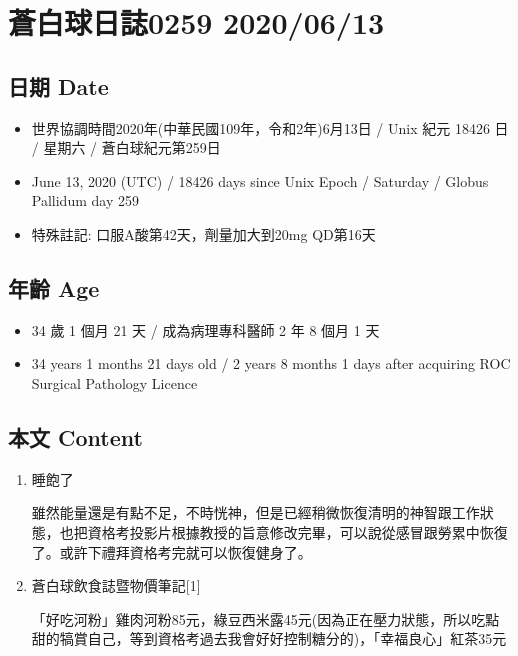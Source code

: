 \documentclass[a5paper, 11pt
]{book}
\providecommand{\tightlist}{%
  \setlength{\itemsep}{0pt}\setlength{\parskip}{0pt}}
\begin{document}
\hypertarget{ux84bcux767dux7403ux65e5ux8a8c0259-20200613}{%
\section{蒼白球日誌0259
2020/06/13}\label{ux84bcux767dux7403ux65e5ux8a8c0259-20200613}}

\hypertarget{ux65e5ux671f-date-12}{%
\subsection{日期 Date}\label{ux65e5ux671f-date-12}}

\begin{itemize}
\tightlist
\item
  世界協調時間2020年(中華民國109年，令和2年)6月13日 / Unix 紀元 18426 日
  / 星期六 / 蒼白球紀元第259日
\item
  June 13, 2020 (UTC) / 18426 days since Unix Epoch / Saturday / Globus
  Pallidum day 259
\item
  特殊註記: 口服A酸第42天，劑量加大到20mg QD第16天
\end{itemize}

\hypertarget{ux5e74ux9f61-age-12}{%
\subsection{年齡 Age}\label{ux5e74ux9f61-age-12}}

\begin{itemize}
\tightlist
\item
  34 歲 1 個月 21 天 / 成為病理專科醫師 2 年 8 個月 1 天
\item
  34 years 1 months 21 days old / 2 years 8 months 1 days after
  acquiring ROC Surgical Pathology Licence
\end{itemize}

\hypertarget{ux672cux6587-content-12}{%
\subsection{本文 Content}\label{ux672cux6587-content-12}}

\begin{enumerate}
\def\labelenumi{\arabic{enumi}.}
\item
  睡飽了

  雖然能量還是有點不足，不時恍神，但是已經稍微恢復清明的神智跟工作狀態，也把資格考投影片根據教授的旨意修改完畢，可以說從感冒跟勞累中恢復了。或許下禮拜資格考完就可以恢復健身了。
\item
  蒼白球飲食誌暨物價筆記{[}1{]}

  「好吃河粉」雞肉河粉85元，綠豆西米露45元(因為正在壓力狀態，所以吃點甜的犒賞自己，等到資格考過去我會好好控制糖分的)，「幸福良心」紅茶35元
\end{enumerate}
\end{document}
